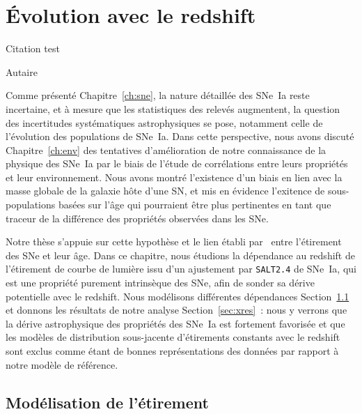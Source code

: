 \documentclass[../main/main.tex]{subfiles}
\begin{document}
\raggedbottom


\chapter{\'Evolution avec le redshift}\label{ch:stretch}

\epigraph{\openquote Citation test\closequote}{Autaire}

Comme présenté Chapitre~\ref{ch:sne}, la nature détaillée des SNe~Ia reste
incertaine, et à mesure que les statistiques des relevés augmentent, la question
des incertitudes systématiques astrophysiques se pose, notamment celle de
l'évolution des populations de SNe~Ia. Dans cette perspective, nous avons
discuté Chapitre~\ref{ch:env} des tentatives d'amélioration de notre
connaissance de la physique des SNe~Ia par le biais de l'étude de corrélations
entre leurs propriétés et leur environnement. Nous avons montré l'existence d'un
biais en lien avec la masse globale de la galaxie hôte d'une SN, et mis en
évidence l'exitence de sous-populations basées sur l'âge qui pourraient être
plus pertinentes en tant que traceur de la différence des propriétés observées
dans les SNe.

Notre thèse s'appuie sur cette hypothèse et le lien établi
par~\cite{rigault2020} entre l'étirement des SNe et leur âge. Dans ce chapitre,
nous étudions la dépendance au redshift de l'étirement de courbe de lumière issu
d'un ajustement par \texttt{SALT2.4} de SNe~Ia, qui est une propriété purement
intrinsèque des SNe, afin de sonder sa dérive potentielle avec le redshift. Nous
modélisons différentes dépendances Section~\ref{sec:xmod} et donnons les
résultats de notre analyse Section~\ref{sec:xres}~: nous y verrons que la dérive
astrophysique des propriétés des SNe~Ia est fortement favorisée et que les
modèles de distribution sous-jacente d'étirements constants avec le redshift
sont exclus comme étant de bonnes représentations des données par rapport à
notre modèle de référence.

\vfill
\minitoc
\vfill

\newpage

\section{Modélisation de l'étirement}\label{sec:xmod}
\end{document}
